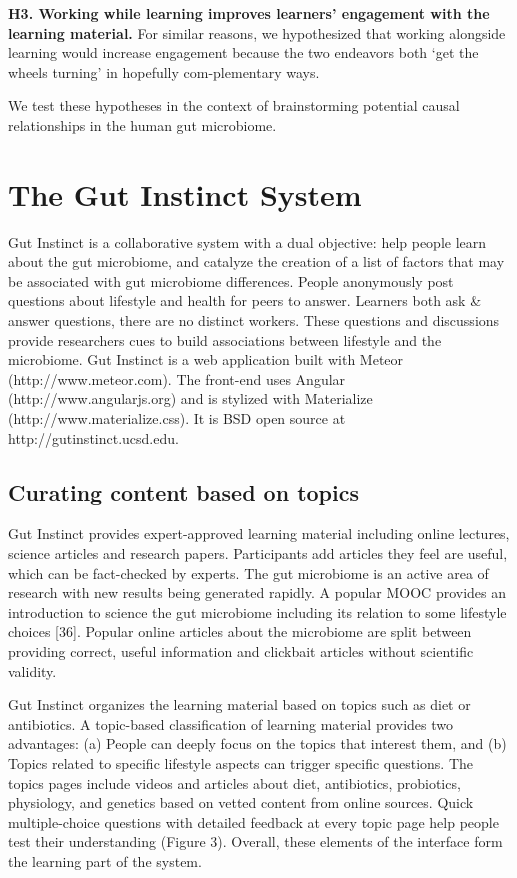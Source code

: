 \textbf{H3. Working while learning improves learners’ engagement with the learning material.} 
For similar reasons, we hypothesized that working alongside learning would increase engagement because the two endeavors both ‘get the wheels turning’ in hopefully com-plementary ways.

We test these hypotheses in the context of brainstorming potential causal relationships in the human gut microbiome. 

\section{The Gut Instinct System}
Gut Instinct is a collaborative system with a dual objective: help people learn about the gut microbiome, and catalyze the creation of a list of factors that may be associated with gut microbiome differences. People anonymously post questions about lifestyle and health for peers to answer. Learners both ask \& answer questions, there are
no distinct workers. These questions and discussions provide researchers cues to build associations between lifestyle and the microbiome.
Gut Instinct is a web application built with Meteor (http://www.meteor.com). The front-end uses Angular (http://www.angularjs.org) and is stylized with Materialize (http://www.materialize.css). It is BSD open source at http://gutinstinct.ucsd.edu.

\subsection{Curating content based on topics}
Gut Instinct provides expert-approved learning material including online lectures, science articles and research papers. Participants add articles they feel are useful, which can be fact-checked by experts. The gut microbiome is an active area of research with new results being generated rapidly. A popular MOOC provides an introduction to science the gut microbiome including its relation to some lifestyle choices [36]. Popular online articles about the microbiome are split between providing correct, useful information and clickbait articles without scientific validity.

Gut Instinct organizes the learning material based on topics such as diet or antibiotics. A topic-based classification of learning material provides two advantages: (a) People can deeply focus on the topics that interest them, and (b) Topics related to specific lifestyle aspects can trigger specific questions. The topics pages include videos and articles about diet, antibiotics, probiotics, physiology, and genetics based on vetted content from online sources. Quick multiple-choice questions with detailed feedback at every topic page help people test their understanding (Figure 3). Overall, these elements of the interface form the learning part of the system. 

